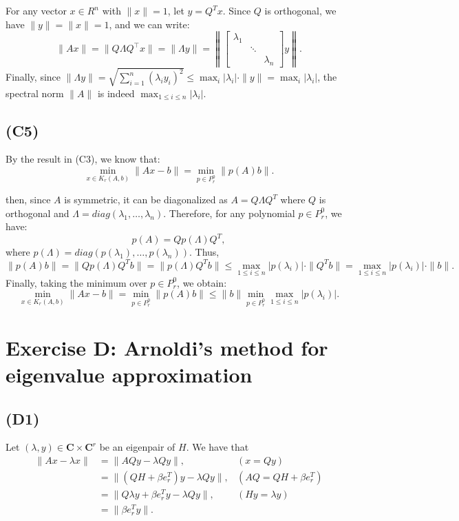 \documentclass{article}
\begin{document}
For any vector $ x \in R^n $ with $ \|x\| = 1 $, let $ y = Q^T x $. 
Since $ Q $ is orthogonal, we have $ \|y\| = \|x\| = 1 $, and we can write:
 \[
\|Ax\| = \|Q \Lambda Q^\top x\| = \|\Lambda y\| = \left\|
   [\begin{array}{ccc}
        \lambda_1 & &  \\
         & \ddots &  \\
         & & \lambda_n 
    \end{array} ] y\right \|.
\]
Finally, since $ \|\Lambda y\| = \sqrt{\sum_{i=1}^n (\lambda_i y_i)^2} \leq \max_{i} |\lambda_i| \cdot \|y\| = \max_{i} |\lambda_i| $, the spectral norm $ \|A\| $ is indeed $ \max_{1 \leq i \leq n} |\lambda_i| $.

\subsection*{(C5)}
By the result in (C3), we know that:
   \[
   \min_{x \in K_r(A, b)} \|Ax - b\| = \min_{p \in P_r^0} \|p(A)b\|.
   \]

then, since $ A $ is symmetric, it can be diagonalized as $ A = Q\Lambda Q^T$ where $ Q $ is orthogonal and $ \Lambda = diag(\lambda_1, \dots, \lambda_n) $.
Therefore, for any polynomial $ p \in P_r^0 $, we have:
   \[
   p(A) = Q p(\Lambda) Q^T,
   \]
   where $ p(\Lambda) = diag(p(\lambda_1), \dots, p(\lambda_n)) $.
 Thus,
   \[
   \|p(A) b\| = \|Q p(\Lambda) Q^T b\| = \|p(\Lambda) Q^T b\| \leq \max_{1 \leq i \leq n} |p(\lambda_i)| \cdot \|Q^T b\| = \max_{1 \leq i \leq n} |p(\lambda_i)| \cdot \|b\|.
   \]
Finally, taking the minimum over $ p \in P_r^0 $, we obtain:
   \[
   \min_{x \in K_r(A, b)} \|Ax - b\| = \min_{p \in P_r^0} \|p(A) b\| \leq \|b\| \min_{p \in P_r^0} \max_{1 \leq i \leq n} |p(\lambda_i)|.
   \]

\section{Exercise D: Arnoldi’s method for eigenvalue approximation}
\subsection*{(D1)}
Let $(\lambda, y) \in \mathbf{C} \times \mathbf{C}^r$ be an eigenpair of $H$. We have that
\begin{align*}
    \|Ax-\lambda x \| & = \|AQy-\lambda Qy \|, & (x=Qy)\\
    &=\|(QH+\beta e_r^T)y-\lambda Qy \|, &  (AQ = QH+\beta e_r^T) \\
    &=\|Q \lambda y+\beta e_r^Ty-\lambda Qy \|, & (Hy=\lambda y)\\
    &=\|\beta e_r^Ty \|. &
\end{align*}
\end{document}
